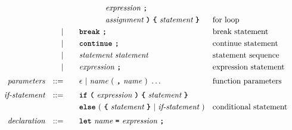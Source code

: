 \begin{alignat*}{9}
&&                       &&     &\quad && \ \ \ \ \ \ \ \ \ \ \textit{expression} \ \textbf{\texttt{;}} \\
&&                       &&     &\quad && \ \ \ \ \ \ \ \ \ \ \textit{assignment} \ \textbf{\texttt{)}} \ 
                                            \textbf{\texttt{\{}}\  \textit{statement}   \ \textbf{\texttt{\}}} 
                                                           && \textrm{for loop}\\
&&                       && |   &\quad && \textbf{\texttt{break}}\ \textbf{\texttt{;}}
                                                           && \textrm{break statement}\\
&&                       && |   &\quad && \textbf{\texttt{continue}}\ \textbf{\texttt{;}}
                                                           && \textrm{continue statement}\\
&&                       && |   &\quad &&  \textit{statement} \ 
                                    \textit{statement}     && \textrm{statement sequence} \\
&&                       && |   &\quad &&  \textit{expression} \ \textbf{\texttt{;}}
                                                           && \textrm{expression statement} \\[1mm] 
&& \textit{parameters}   && ::= &\quad &&  \epsilon\ | \  \textit{name} \ 
                                                   (\ \textbf{\texttt{,}} \ \textit{name}\ )\ \ldots
                                                            && \textrm{function parameters}   \\[1mm]
&& \textit{if-statement} && ::= &\quad &&  \textbf{\texttt{if}}\
                                   \textbf{\texttt{(}}\ \textit{expression} \ \textbf{\texttt{)}}\ 
                                   \textbf{\texttt{\{}}\ \textit{statement} \ \textbf{\texttt{\}}}\\
&&                       &&     &      && \textbf{\texttt{else}}\
                                          (\ \textbf{\texttt{\{}}\ \textit{statement}\ \textbf{\texttt{\}}}
                                          \ | \
                                          \textit{if-statement} \ )
                                                            && \textrm{conditional statement}   \\[1mm]
&& \textit{declaration}   && ::= &\quad &&  \textbf{\texttt{let}}\  \textit{name} \ 
                                           \textbf{\texttt{=}}\  \textit{expression} \ \textbf{\texttt{;}}

\end{alignat*}
